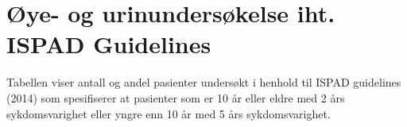\documentclass[]{article}
\begin{document}
\hypertarget{ye--og-urinunderskelse-iht.-ispad-guidelines}{%
\section{Øye- og urinundersøkelse iht. ISPAD
Guidelines}\label{ye--og-urinunderskelse-iht.-ispad-guidelines}}

Tabellen viser antall og andel pasienter undersøkt i henhold til ISPAD
guidelines (2014) som spesifiserer at pasienter som er 10 år eller eldre
med 2 års sykdomsvarighet eller yngre enn 10 år med 5 års
sykdomsvarighet.

 
  \providecommand{\huxb}[2]{\arrayrulecolor[RGB]{#1}\global\arrayrulewidth=#2pt}
  \providecommand{\huxvb}[2]{\color[RGB]{#1}\vrule width #2pt}
  \providecommand{\huxtpad}[1]{\rule{0pt}{\baselineskip+#1}}
  \providecommand{\huxbpad}[1]{\rule[-#1]{0pt}{#1}}
\end{document}

